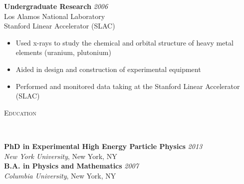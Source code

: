 \documentclass[9pt]{article}
\newenvironment{changemargin}[2]{%
  \begin{list}{}{%
    \setlength{\topsep}{0pt}%
    \setlength{\leftmargin}{#1}%
    \setlength{\rightmargin}{#2}%
    \setlength{\listparindent}{\parindent}%
    \setlength{\itemindent}{\parindent}%
    \setlength{\parsep}{\parskip}%
  }%
  \item[]}{\end{list}
}
\newcommand{\lineover}{
	\begin{changemargin}{-0.05in}{-0.05in}
		\vspace*{-8pt}
		\hrulefill \\
		\vspace*{-2pt}
	\end{changemargin}
}
\newcommand{\header}[1]{
	\begin{changemargin}{-0.5in}{-0.5in}
		\scshape{#1}\\
  	\lineover
	\end{changemargin}
}
\newenvironment{body} {
	\vspace*{-16pt}
	\begin{changemargin}{-0.25in}{-0.5in}
  }	
	{\end{changemargin}
}
\begin{document}
\begin{body}
\begin{itemize}
        \end{itemize}

        \medskip

	\textbf {Undergraduate Research} \hfill \emph{2006}\\
        Los Alamos National Laboratory \\
        Stanford Linear Accelerator (SLAC) \\

        \begin{itemize}
          \item Used x-rays to study the chemical and orbital structure of heavy metal elements (uranium, plutonium)
          \item Aided in design and construction of experimental equipment
          \item Performed and monitored data taking at the Stanford Linear Accelerator (SLAC) 
        \end{itemize}

\end{body}

\smallskip

\header{Education}

\begin{body}
	\vspace{14pt}
	\textbf{PhD in Experimental High Energy Particle Physics }{} \hfill \emph{2013}{} \\
	\emph{New York University}, New York, NY{} \\
  \medskip
	\textbf{B.A. in Physics and Mathematics} \hfill \emph{2007} \\
	\emph{Columbia University}, New York, NY\\
\end{body}
\end{document}
